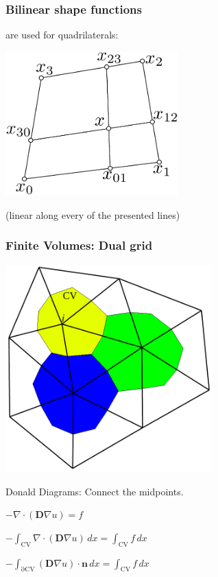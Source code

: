 \documentclass[xcolor=dvipsnames]{beamer}
\begin{document}
\begin {frame} [t]
\frametitle{Bilinear shape functions}
are used for quadrilaterals:
\centerline {\includegraphics [width = 0.5\textwidth] {bilinear-geometric.pdf}}
\centerline {(linear along every of the presented lines)}
\end {frame}

\begin {frame} [t]
\frametitle{Finite Volumes: Dual grid}
\centerline{\includegraphics [width=0.6\textwidth] {FV-Elem-Donald-Scheme.pdf}}
{%
\centerline{Donald Diagrams: Connect the midpoints.}
}%
{%
\centerline {$\displaystyle - \nabla \cdot (\mathbf{D} \nabla u) = f$}
}%
{%
\centerline {$\displaystyle - \int_{\mathrm{CV}} \nabla \cdot (\mathbf{D} \nabla u) \, dx = \int_{\mathrm{CV}} f \, dx$}
}%
{%
\centerline {$\displaystyle - \int_{\mathrm{\partial CV}} (\mathbf{D} \nabla u) \cdot \mathbf{n} \, dx = \int_{\mathrm{CV}} f \, dx$}
}%
\end {frame}
\end{document}
